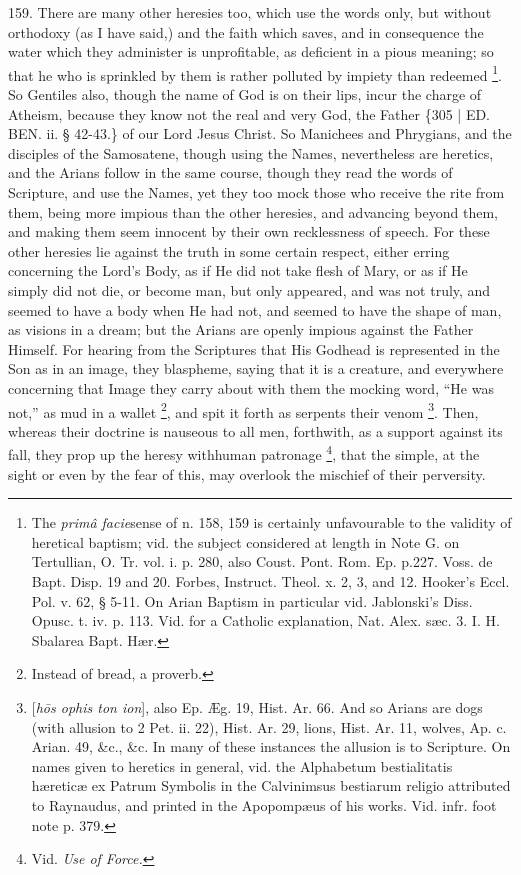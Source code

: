 159. There are many other
heresies too, which use the words only, but without orthodoxy (as I
have said,) and the faith which saves, and in consequence the water
which they administer is unprofitable, as deficient in a pious
meaning; so that he who is sprinkled by them is rather polluted by
impiety than redeemed \footnote{The \emph{primâ facie}sense of n. 158, 159 is certainly unfavourable
to the validity of heretical baptism; vid. the subject considered at
length in Note G. on Tertullian, O. Tr. vol. i. p. 280, also Coust.
Pont. Rom. Ep. p.\emph{}227. Voss. de Bapt. Disp. 19 and 20. Forbes,
Instruct. Theol. x. 2, 3, and 12. Hooker's Eccl. Pol. v. 62, § 5-11.
On Arian Baptism in particular vid. Jablonski's Diss. Opusc. t. iv. p.
113. Vid. for a Catholic explanation, Nat. Alex. sæc. 3. I. H.
Sbalarea Bapt. Hær.}. So
Gentiles also, though the name of God is on their lips, incur the
charge of Atheism, because they know not the real and very God, the
Father \{305 | ED.
BEN. ii. § 42-43.\} of our Lord Jesus Christ. So
Manichees and Phrygians, and the disciples of the Samosatene, though
using the Names, nevertheless are heretics, and the Arians follow in
the same course, though they read the words of Scripture, and use the
Names, yet they too mock those who receive the rite from them, being
more impious than the other heresies, and advancing beyond them, and
making them seem innocent by their own recklessness of speech. For
these other heresies lie against the truth in some certain respect,
either erring concerning the Lord's Body, as if He did not take flesh
of Mary, or as if He simply did not die, or become man, but only
appeared, and was not truly, and seemed to have a body when He had
not, and seemed to have the shape of man, as visions in a dream; but
the Arians are openly impious against the Father Himself. For hearing
from the Scriptures that His Godhead is represented in the Son as in
an image, they blaspheme, saying that it is a creature, and everywhere
concerning that Image they carry about with them the mocking word, ``He
was not,'' as mud in a wallet \footnote{Instead of bread, a proverb.}, and spit it forth as serpents their venom \footnote{[\emph{h\={o}s ophis ton ion}], also Ep. Æg. 19, Hist. Ar. 66. And
so Arians are dogs (with allusion to 2 Pet. ii. 22), Hist. Ar. 29,
lions, Hist. Ar. 11, wolves, Ap. c. Arian. 49, \&c., \&c. In
many of these instances the allusion is to Scripture. On names given
to heretics in general, vid. the Alphabetum bestialitatis hæreticæ
ex Patrum Symbolis in the Calvinimsus bestiarum religio attributed to
Raynaudus, and printed in the Apopompæus of his works. Vid. infr.
foot note p. 379.}. Then, whereas their doctrine is nauseous to all men,
forthwith, as a support against its fall, they prop up the heresy with\emph{}human patronage \footnote{Vid. \emph{Use of Force.}},
that the simple, at the sight or even by the fear of this, may
overlook the mischief of their perversity.

